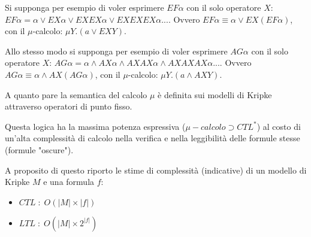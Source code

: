 Si supponga per esempio di voler esprimere $EF\alpha$ con il solo operatore $X$: $EF\alpha = \alpha \lor EX\alpha \lor EXEX\alpha \lor EXEXEX\alpha ...$.
Ovvero $EF\alpha \equiv \alpha \lor EX(EF\alpha)$, con il $\mu$-calcolo: $\mu Y.(a \lor EXY)$.

Allo stesso modo si supponga per esempio di voler esprimere $AG\alpha$ con il solo operatore $X$: $AG\alpha = \alpha \land AX\alpha \land AXAX\alpha \land AXAXAX\alpha ...$.
Ovvero $AG\alpha \equiv \alpha \land AX(AG\alpha)$, con il $\mu$-calcolo: $\mu Y.(a \land AXY)$.

A quanto pare la semantica del calcolo $\mu$ \`e definita sui modelli di Kripke attraverso operatori di punto fisso.

Questa logica ha la massima potenza espressiva ($\mu-calcolo \supset CTL^\ast$) al costo di un'alta complessit\`a di calcolo nella verifica e nella leggibilit\`a delle formule stesse (formule "oscure").

A proposito di questo riporto le stime di complessit\`a (indicative) di un modello di Kripke $M$ e una formula $f$:
\begin{itemize}
  \item $CTL \; : \; O(|M| \times |f|)$
  \item $LTL \; : \; O(|M| \times 2^{|f|})$
\end{itemize}
